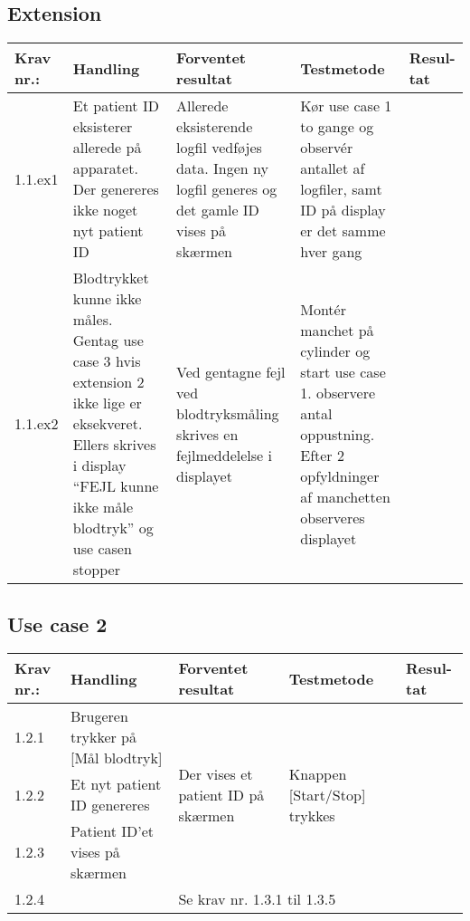 \documentclass[11pt]{article}
\begin{document}
		\subsection*{Extension}
		\begin{center}
			\begin{longtable}{|p{1.5cm}|p{2cm}|p{3cm}|p{3cm}|p{1.1cm}|}
				\hline
				Krav nr.: & Handling & Forventet resultat & Testmetode & Resul-tat  \\\hline
				1.1.ex1 & Et patient ID eksisterer allerede på apparatet. Der genereres ikke noget nyt patient ID & Allerede eksisterende logfil vedføjes data. Ingen ny logfil generes og det gamle ID vises på skærmen & Kør use case 1 to gange og observér antallet af logfiler, samt ID på display er det samme hver gang &  \\
				\hline
				1.1.ex2 & Blodtrykket kunne ikke måles. Gentag use case 3 hvis extension 2 ikke lige er eksekveret. Ellers skrives i display “FEJL kunne ikke måle blodtryk” og use casen stopper  & Ved gentagne fejl ved blodtryksmåling skrives en fejlmeddelelse i displayet & Montér manchet på cylinder og start use case 1. observere antal oppustning. Efter 2 opfyldninger af manchetten observeres displayet & \\ \hline
			\end{longtable}
		\end{center}

	\subsection{Use case 2}
	\begin{center}
		\begin{longtable}{|p{1.5cm}|p{2cm}|p{3cm}|p{3cm}|p{1.1cm}|}
			\hline
			Krav nr.: & Handling & Forventet resultat & Testmetode & Resul-tat  \\\hline
			1.2.1 & Brugeren trykker på [Mål blodtryk] & \multirow{3}{3cm}{Der vises et patient ID på skærmen} & \multirow{3}{3cm}{Knappen [Start/Stop] trykkes} & \multirow{3}{3cm}{}  \\ \cline{1-2} 
			1.2.2 & Et nyt patient ID genereres & & &  \\ \cline{1-2}
			1.2.3 & Patient ID’et vises på skærmen & & &  \\ \hline
			1.2.4 & & \multicolumn{3}{l|}{Se krav nr. 1.3.1 til 1.3.5} \\ 
			\hline
			
		\end{longtable}
	\end{center}
	
\end{document}
